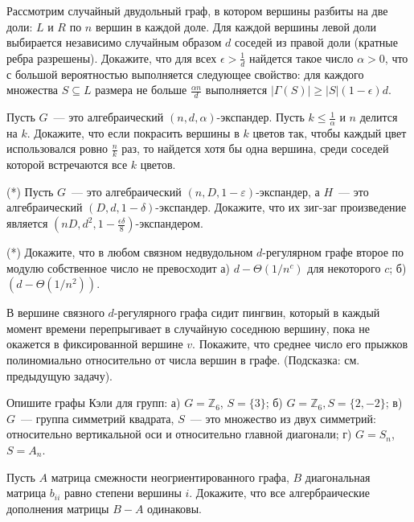 \begin{ptask}{5}
    Рассмотрим случайный двудольный граф, в котором вершины разбиты на две доли: $L$
	и $R$ по $n$ вершин в каждой доле. Для каждой вершины левой доли выбирается
	независимо случайным образом $d$ соседей из правой доли (кратные ребра
	разрешены). Докажите, что для всех $\epsilon > \frac{1}{d}$ найдется такое число
	$\alpha > 0$, что с большой вероятностью выполняется следующее свойство: для
    каждого множества $S \subseteq L$ размера не больше $\frac{\alpha n}{d}$
    выполняется $|\Gamma(S)| \ge |S|(1 - \epsilon)d$.
\end{ptask}

\begin{ptask}{7}
    Пусть $G$~--- это алгебраический $(n,d,\alpha)$-экспандер. Пусть 
	$k\le \frac{1}{\alpha}$ и $n$ делится на $k$. Докажите, что если покрасить
    вершины  в $k$ цветов так, чтобы каждый цвет использовался ровно $\frac{n}{k}$
	раз, то найдется хотя бы одна вершина, среди соседей которой встречаются все $k$
    цветов.
\end{ptask}


\begin{ptask}{9}(*)
	Пусть $G$~--- это алгебраический $(n,D, 1-\varepsilon)$-экспандер, а $H$~--- это
    алгебраический $(D, d, 1-\delta)$-экспандер. Докажите, что их зиг-заг
    произведение является $(nD, d^2, 1 - \frac{\epsilon \delta}{8})$-экспандером.
\end{ptask}

\begin{ptask}{10}(*)
	Докажите, что в любом связном недвудольном $d$-регулярном графе второе по модулю
	собственное число не превосходит а) $d - \Theta(1 / n^c)$ для некоторого $c$;
	б) $(d - \Theta(1 / n^2))$.
\end{ptask}

\begin{ptask}{11}
	В вершине связного $d$-регулярного графа сидит пингвин, который в каждый момент
	времени перепрыгивает в случайную соседнюю вершину, пока не окажется в
    фиксированной вершине $v$. Покажите, что среднее число его прыжков полиномиально
    относительно от числа вершин в графе. (Подсказка: см. предыдущую задачу).
\end{ptask}

\begin{ptask}{12}
    Опишите графы Кэли для групп: а) $G = \mathbb{Z}_6$, $S = \{3\}$; 
	б) $G = \mathbb{Z}_6, S = \{2, -2\}$; в) $G$~--- группа  
	симметрий квадрата, $S$~--- это множество из двух симметрий: относительно вертикальной оси
	и относительно главной диагонали; г) $G = S_n$, $S = A_n$.
\end{ptask}

\begin{ptask}{14}
    Пусть $A$ матрица смежности неогриентированного графа, $B$ диагональная матрица
    $b_{ii}$ равно степени вершины $i$. Докажите, что все алгербраические дополнения
    матрицы $B - A$ одинаковы.
\end{ptask}